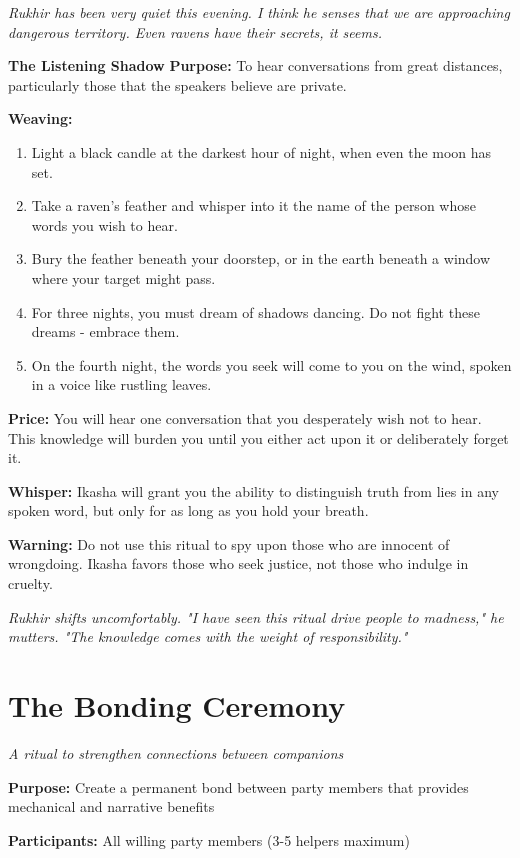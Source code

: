 \documentclass[12pt,twoside]{book}
\newcommand{\ritualname}[1]{\vspace{10pt}\noindent\textbf{\large #1}\vspace{5pt}}
\newcommand{\shadow}[1]{\textit{#1}}
\begin{document}
\shadow{Rukhir has been very quiet this evening. I think he senses that we are approaching dangerous territory. Even ravens have their secrets, it seems.}

\ritualname{The Listening Shadow}
\textbf{Purpose:} To hear conversations from great distances, particularly those that the speakers believe are private.

\textbf{Weaving:} 
\begin{enumerate}
\item Light a black candle at the darkest hour of night, when even the moon has set.
\item Take a raven's feather and whisper into it the name of the person whose words you wish to hear.
\item Bury the feather beneath your doorstep, or in the earth beneath a window where your target might pass.
\item For three nights, you must dream of shadows dancing. Do not fight these dreams - embrace them.
\item On the fourth night, the words you seek will come to you on the wind, spoken in a voice like rustling leaves.
\end{enumerate}

\textbf{Price:} You will hear one conversation that you desperately wish not to hear. This knowledge will burden you until you either act upon it or deliberately forget it.

\textbf{Whisper:} Ikasha will grant you the ability to distinguish truth from lies in any spoken word, but only for as long as you hold your breath.

\textbf{Warning:} Do not use this ritual to spy upon those who are innocent of wrongdoing. Ikasha favors those who seek justice, not those who indulge in cruelty.

\shadow{Rukhir shifts uncomfortably. "I have seen this ritual drive people to madness," he mutters. "The knowledge comes with the weight of responsibility."}

\section*{The Bonding Ceremony}
\textit{A ritual to strengthen connections between companions}

\textbf{Purpose:} Create a permanent bond between party members that provides mechanical and narrative benefits

\textbf{Participants:} All willing party members (3-5 helpers maximum)
\end{document}
